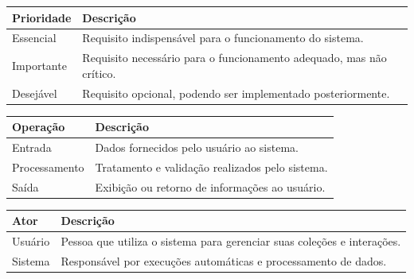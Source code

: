 \begin{quadro}[h!]
\caption{Classificação de Prioridade dos Requisitos}
\label{quad:prioridade}
\begin{tabular}{|p{4cm}|p{11cm}|}
\hline
\textbf{Prioridade} & \textbf{Descrição} \\ \hline
Essencial & Requisito indispensável para o funcionamento do sistema. \\ \hline
Importante & Requisito necessário para o funcionamento adequado, mas não crítico. \\ \hline
Desejável & Requisito opcional, podendo ser implementado posteriormente. \\ \hline
\end{tabular}
\end{quadro}

\begin{quadro}[h!]
\caption{Classificação de Operação dos Requisitos}
\label{quad:operacao}
\begin{tabular}{|p{4cm}|p{11cm}|}
\hline
\textbf{Operação} & \textbf{Descrição} \\ \hline
Entrada & Dados fornecidos pelo usuário ao sistema. \\ \hline
Processamento & Tratamento e validação realizados pelo sistema. \\ \hline
Saída & Exibição ou retorno de informações ao usuário. \\ \hline
\end{tabular}
\end{quadro}

\begin{quadro}[h!]
\caption{Atores do Sistema}
\label{quad:atores}
\begin{tabular}{|p{4cm}|p{11cm}|}
\hline
\textbf{Ator} & \textbf{Descrição} \\ \hline
Usuário & Pessoa que utiliza o sistema para gerenciar suas coleções e interações. \\ \hline
Sistema & Responsável por execuções automáticas e processamento de dados. \\ \hline
\end{tabular}
\end{quadro}


